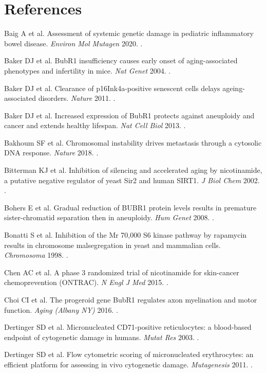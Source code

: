 \documentclass[10pt]{article}
\begin{document}
\section*{References}
\begin{refs}
\item Baig A et al. Assessment of systemic genetic damage in pediatric inflammatory bowel disease. \textit{Environ Mol Mutagen} 2020. .
\item Baker DJ et al. BubR1 insufficiency causes early onset of aging-associated phenotypes and infertility in mice. \textit{Nat Genet} 2004. .
\item Baker DJ et al. Clearance of p16Ink4a-positive senescent cells delays ageing-associated disorders. \textit{Nature} 2011. .
\item Baker DJ et al. Increased expression of BubR1 protects against aneuploidy and cancer and extends healthy lifespan. \textit{Nat Cell Biol} 2013. .
\item Bakhoum SF et al. Chromosomal instability drives metastasis through a cytosolic DNA response. \textit{Nature} 2018. .
\item Bitterman KJ et al. Inhibition of silencing and accelerated aging by nicotinamide, a putative negative regulator of yeast Sir2 and human SIRT1. \textit{J Biol Chem} 2002. .
\item Bohers E et al. Gradual reduction of BUBR1 protein levels results in premature sister-chromatid separation then in aneuploidy. \textit{Hum Genet} 2008. .
\item Bonatti S et al. Inhibition of the Mr 70,000 S6 kinase pathway by rapamycin results in chromosome malsegregation in yeast and mammalian cells. \textit{Chromosoma} 1998. .
\item Chen AC et al. A phase 3 randomized trial of nicotinamide for skin-cancer chemoprevention (ONTRAC). \textit{N Engl J Med} 2015. .
\item Choi CI et al. The progeroid gene BubR1 regulates axon myelination and motor function. \textit{Aging (Albany NY)} 2016. .
\item Dertinger SD et al. Micronucleated CD71-positive reticulocytes: a blood-based endpoint of cytogenetic damage in humans. \textit{Mutat Res} 2003. .
\item Dertinger SD et al. Flow cytometric scoring of micronucleated erythrocytes: an efficient platform for assessing in vivo cytogenetic damage. \textit{Mutagenesis} 2011. .

\end{refs}
\end{document}
